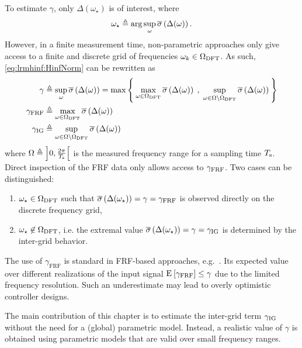 To estimate $\gamma$, only $\Delta(\omega_{\star})$ is of interest, where
\begin{equation}
 \omega_{\star} 
     \triangleq 
       \arg
         \sup_{\omega} 
            \overline{\sigma} \left( \Delta(\omega) \right) 
  \text{.}
  \label{eq:lrmhinf:omega-star}
\end{equation}
However, in a finite measurement time, non-parametric approaches only give access to a finite and discrete grid of frequencies $\omega_k \in \Omega_{\mathrm{DFT}}$.
As such, \eqref{eq:lrmhinf:HinfNorm} can be rewritten as
\begin{align}
  \gamma &\triangleq 
    \sup_{\omega} 
       \overline{\sigma} \left( \Delta(\omega) \right) 
         = \max 
             \Set{
                \max_{\omega \in \ensuremath{\Omega_{\mathrm{DFT}}}} 
                  \ensuremath{ \overline{\sigma} \left( \Delta(\omega) \right) }
                \;,\;
                \sup_{\omega \in \ensuremath{\Omega \setminus \Omega_{\mathrm{DFT}}}} 
                  \ensuremath{ \overline{\sigma} \left( \Delta(\omega) \right) }
                }
  \label{eq:lrmhinf:gamma-split-grid}\\
  \gamma_{\mathrm{FRF}} & \triangleq 
    \max_{\omega \in \Omega_{\mathrm{DFT}}  } 
       \overline{\sigma} \left( \Delta(\omega) \right) 
  \label{eq:lrmhinf:gamma:atGrid}\\
  \gamma_{\mathrm{IG}} & \triangleq 
    \sup_{\omega \in \Omega \setminus \Omega_{\mathrm{DFT}}} 
       \overline{\sigma} \left( \Delta(\omega) \right) 
   \label{eq:lrmhinf:gamma:interGrid}
\end{align}
where $\Omega \triangleq \left] 0,\frac{2\pi}{T_{\mathrm{s}}} \right[$ is the measured frequency range for a sampling time $T_{\mathrm{s}}$.
Direct inspection of the \gls{FRF} data only allows access to $\gamma_{\mathrm{FRF}}$.
Two cases can be distinguished:
\begin{enumerate}
  \item $\omega_{\star} \in \Omega_{\mathrm{DFT}}$ such that $ \overline{\sigma} \left( \Delta(\omega_{\star}) \right)  = \gamma =\gamma_{\mathrm{FRF}}$ is observed directly on the discrete frequency grid,
  \item $\omega_{\star} \not\in \Omega_{\mathrm{DFT}}$, i.e. the extremal value $ \overline{\sigma} \left( \Delta(\omega_{\star}) \right)   = \gamma = \gamma_{\mathrm{IG}}$ is determined by the inter-grid behavior.
\end{enumerate}
The use of $\gamma_{\mathrm{FRF}}$ is standard in \gls{FRF}-based approaches, e.g.~\citep{vandeWal2002}.
Its expected value over different realizations of the input signal $\operatorname{\mathrm{E}}_{} \left[ \gamma_{\mathrm{FRF}} \right] \leq \gamma$ due to the limited frequency resolution.
Such an underestimate may lead to overly optimistic controller designs.

The main contribution of this chapter is to  estimate the inter-grid term $\gamma_{\mathrm{IG}}$ without the need for a (global) parametric model.
Instead, a  realistic value of $\gamma$ is obtained using parametric models that are valid over small frequency ranges.

